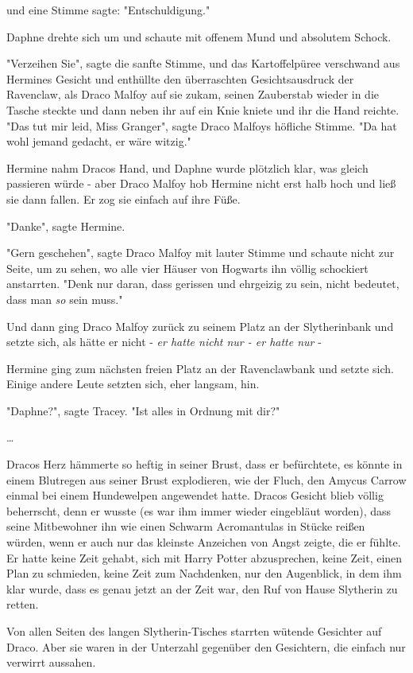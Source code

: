 {und eine Stimme sagte: "Entschuldigung."

Daphne drehte sich um und schaute mit offenem Mund und absolutem Schock.

"Verzeihen Sie", sagte die sanfte Stimme, und das Kartoffelpüree verschwand aus Hermines Gesicht und enthüllte den überraschten Gesichtsausdruck der Ravenclaw, als Draco Malfoy auf sie zukam, seinen Zauberstab wieder in die Tasche steckte und dann neben ihr auf ein Knie kniete und ihr die Hand reichte. "Das tut mir leid, Miss Granger", sagte Draco Malfoys höfliche Stimme. "Da hat wohl jemand gedacht, er wäre witzig."

Hermine nahm Dracos Hand, und Daphne wurde plötzlich klar, was gleich passieren würde - aber Draco Malfoy hob Hermine nicht erst halb hoch und ließ sie dann fallen. Er zog sie einfach auf ihre Füße.

"Danke", sagte Hermine.

"Gern geschehen", sagte Draco Malfoy mit lauter Stimme und schaute nicht zur Seite, um zu sehen, wo alle vier Häuser von Hogwarts ihn völlig schockiert anstarrten. "Denk nur daran, dass gerissen und ehrgeizig zu sein, nicht bedeutet, dass man \emph{so} sein muss."

Und dann ging Draco Malfoy zurück zu seinem Platz an der Slytherinbank und setzte sich, als hätte er nicht - \emph{er hatte nicht nur - er hatte nur} -

Hermine ging zum nächsten freien Platz an der Ravenclawbank und setzte sich. Einige andere Leute setzten sich, eher langsam, hin.

"Daphne?", sagte Tracey. "Ist alles in Ordnung mit dir?"

…

Dracos Herz hämmerte so heftig in seiner Brust, dass er befürchtete, es könnte in einem Blutregen aus seiner Brust explodieren, wie der Fluch, den Amycus Carrow einmal bei einem Hundewelpen angewendet hatte. Dracos Gesicht blieb völlig beherrscht, denn er wusste (es war ihm immer wieder eingebläut worden), dass seine Mitbewohner ihn wie einen Schwarm Acromantulas in Stücke reißen würden, wenn er auch nur das kleinste Anzeichen von Angst zeigte, die er fühlte. Er hatte keine Zeit gehabt, sich mit Harry Potter abzusprechen, keine Zeit, einen Plan zu schmieden, keine Zeit zum Nachdenken, nur den Augenblick, in dem ihm klar wurde, dass es genau jetzt an der Zeit war, den Ruf von Hause Slytherin zu retten.

Von allen Seiten des langen Slytherin-Tisches starrten wütende Gesichter auf Draco. Aber sie waren in der Unterzahl gegenüber den Gesichtern, die einfach nur verwirrt aussahen.

}
